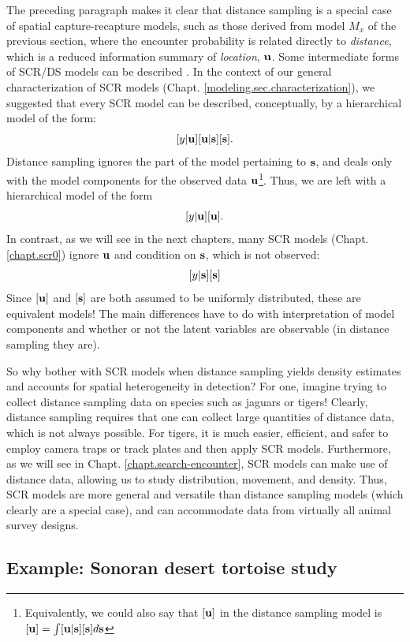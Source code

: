 The preceding paragraph makes it clear that distance sampling is a
special case of spatial capture-recapture models, such as those
derived from model $M_{x}$ of the previous section, where the
encounter probability is related directly to {\it distance}, which is
a reduced information summary of {\it location}, ${\bf u}$.  Some
intermediate forms of SCR/DS models can be described
\citep{royle_etal:2011mee}.  In the context of our general
characterization of SCR models
(Chapt. \ref{modeling.sec.characterization}), we suggested that every
SCR model can be described, conceptually, by a hierarchical model of
the form:
\[
 [y|{\bf u}][{\bf u}|{\bf s}][{\bf s}].
\]
Distance sampling ignores the part of the model pertaining to ${\bf
  s}$, and deals only with the model components for the observed
data  ${\bf u}$\footnote{Equivalently, we could also say that $[{\bf u}]$ in
  the distance sampling model is $[{\bf u}] = \int [{\bf u}|{\bf s}][{\bf s}]
  d{\bf s}$}. Thus, we are left with a hierarchical model of the form
\[
[y|{\bf u}][{\bf u}].
\]
In contrast, as we will see in the next chapters, many  SCR models
(Chapt. \ref{chapt.scr0}) ignore ${\bf u}$ and condition on ${\bf s}$,
which is not observed:
\[
[y|{\bf s}][{\bf s}]
\]
Since $[{\bf u}]$ and $[{\bf s}]$ are both assumed to be uniformly
distributed, these are equivalent models! The main differences have to
do with interpretation of model components and whether or not the
latent variables are observable (in distance sampling they are).

So why bother with SCR models when distance sampling yields density
estimates and accounts for spatial heterogeneity in detection? For
one, imagine trying to collect distance sampling data on species such
as jaguars or tigers!  Clearly, distance sampling requires that one
can collect large quantities of distance data, which is not always
possible. For tigers, it is much easier, efficient, and safer to
employ camera traps or track plates and then apply SCR
models. Furthermore, as we will see in Chapt.
\ref{chapt.search-encounter}, SCR models can make use of distance data,
allowing us to study distribution, movement, and density. Thus, SCR
models are more general and versatile than distance sampling models
(which clearly are a special case), and can accommodate data from
virtually all animal survey designs.

\subsection{Example: Sonoran desert tortoise study}

